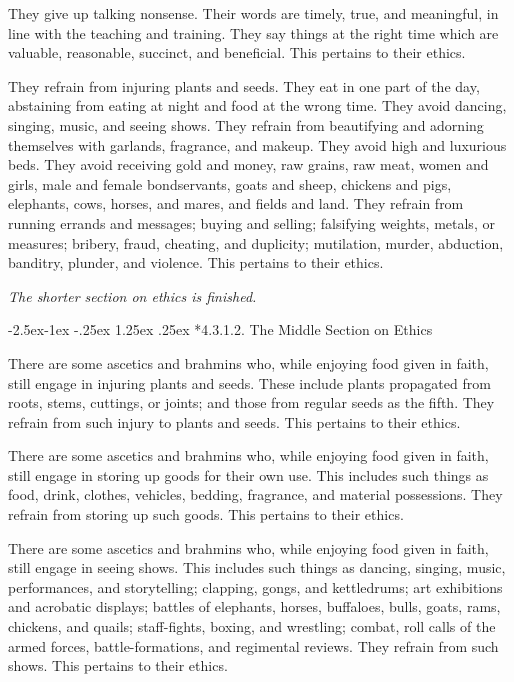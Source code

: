 \documentclass[12pt,openany]{book}%
\makeatletter
\renewcommand\paragraph{\@startsection{paragraph}{4}{\z@}%
            {-2.5ex\@plus -1ex \@minus -.25ex}%
            {1.25ex \@plus .25ex}%
            {\noindent\Semiboldnormalfont\normalsize}}
\newcommand*{\scendsection}[1]{\begin{center}\textit{#1}\end{center}}
\makeatother
\begin{document}
They give up talking nonsense. Their words are timely, true, and meaningful, in line with the teaching and training. They say things at the right time which are valuable, reasonable, succinct, and beneficial. This pertains to their ethics. 

They refrain from injuring plants and seeds. They eat in one part of the day, abstaining from eating at night and food at the wrong time. They avoid dancing, singing, music, and seeing shows. They refrain from beautifying and adorning themselves with garlands, fragrance, and makeup. They avoid high and luxurious beds. They avoid receiving gold and money, raw grains, raw meat, women and girls, male and female bondservants, goats and sheep, chickens and pigs, elephants, cows, horses, and mares, and fields and land. They refrain from running errands and messages; buying and selling; falsifying weights, metals, or measures; bribery, fraud, cheating, and duplicity; mutilation, murder, abduction, banditry, plunder, and violence. This pertains to their ethics. 

\scendsection{The shorter section on ethics is finished. }

\paragraph*{4.3.1.2. The Middle Section on Ethics }

There are some ascetics and brahmins who, while enjoying food given in faith, still engage in injuring plants and seeds. These include plants propagated from roots, stems, cuttings, or joints; and those from regular seeds as the fifth. They refrain from such injury to plants and seeds. This pertains to their ethics. 

There are some ascetics and brahmins who, while enjoying food given in faith, still engage in storing up goods for their own use. This includes such things as food, drink, clothes, vehicles, bedding, fragrance, and material possessions. They refrain from storing up such goods. This pertains to their ethics. 

There are some ascetics and brahmins who, while enjoying food given in faith, still engage in seeing shows. This includes such things as dancing, singing, music, performances, and storytelling; clapping, gongs, and kettledrums; art exhibitions and acrobatic displays; battles of elephants, horses, buffaloes, bulls, goats, rams, chickens, and quails; staff-fights, boxing, and wrestling; combat, roll calls of the armed forces, battle-formations, and regimental reviews. They refrain from such shows. This pertains to their ethics. 
\end{document}
